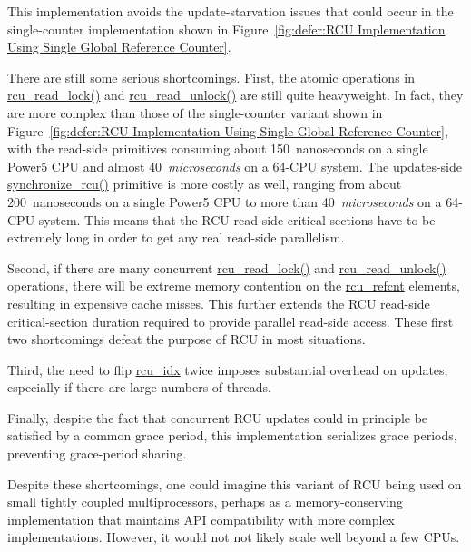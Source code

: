 This implementation avoids the update-starvation issues that could
occur in the single-counter implementation shown in
Figure~\ref{fig:defer:RCU Implementation Using Single Global Reference Counter}.

There are still some serious shortcomings.
First, the atomic operations in \url{rcu_read_lock()}
and \url{rcu_read_unlock()}
are still quite heavyweight.
In fact, they are more complex than those
of the single-counter variant shown in
Figure~\ref{fig:defer:RCU Implementation Using Single Global Reference Counter},
with the read-side primitives consuming about 150~nanoseconds on a single
Power5 CPU and almost 40~\emph{microseconds} on a 64-CPU system.
The updates-side \url{synchronize_rcu()} primitive is more costly as
well, ranging from about 200~nanoseconds on a single Power5 CPU to
more than 40~\emph{microseconds} on a 64-CPU system.
This means that the RCU read-side critical sections
have to be extremely long in order to get any real
read-side parallelism.

Second, if there are many concurrent \url{rcu_read_lock()}
and \url{rcu_read_unlock()} operations, there will
be extreme memory contention on the \url{rcu_refcnt}
elements, resulting in expensive cache misses.
This further extends the RCU read-side critical-section
duration required to provide parallel read-side access.
These first two shortcomings defeat the purpose of RCU in most
situations.

Third, the need to flip \url{rcu_idx} twice imposes substantial
overhead on updates, especially if there are large
numbers of threads.

Finally, despite the fact that concurrent RCU updates could in principle be
satisfied by a common grace period, this implementation
serializes grace periods, preventing grace-period
sharing.

 \QuickQuizEnd

Despite these shortcomings, one could imagine this variant
of RCU being used on small tightly coupled multiprocessors,
perhaps as a memory-conserving implementation that maintains
API compatibility with more complex implementations.
However, it would not not likely scale well beyond a few CPUs.

